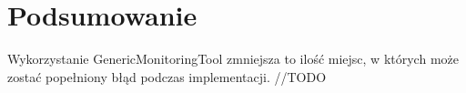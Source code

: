 \section{Podsumowanie}
Wykorzystanie GenericMonitoringTool zmniejsza to ilość miejsc, w których może zostać popełniony błąd podczas implementacji.
//TODO